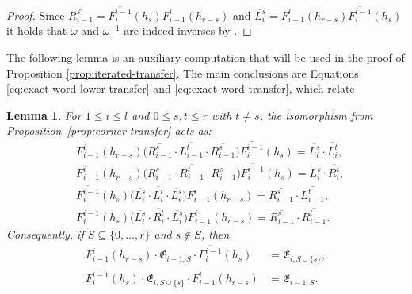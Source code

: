 \documentclass[12pt]{amsart}
\newtheorem{lemma}[theorem]{Lemma}
\theoremstyle{definition}
\theoremstyle{remark}
\numberwithin{equation}{section}
\numberwithin{figure}{section}
\newcommand{\Li}[2]{\overline{L^{#1}_{#2}}}
\newcommand{\Ri}[2]{\overline{R^{#1}_{#2}}}
\begin{document}
\begin{proof}
Since $\Ri{s}{i-1} =  \overline{F_i^{i-1}}(h_s)F_{i-1}^{i}(h_{r-s})$ and $\Li{s}{i} = F_{i-1}^{i}(h_{r-s}) \overline{F_i^{i-1}}(h_s)$ it holds that $\omega$ and $\omega^{-1}$ are indeed inverses by \cite[Exercise 3.4]{Bresar2014}. 
\end{proof}

The following lemma is an auxiliary computation that will be used in the proof of Proposition \ref{prop:iterated-transfer}. The main conclusions are Equations \eqref{eq:exact-word-lower-transfer} and \eqref{eq:exact-word-transfer}, which relate 

\begin{lemma}\label{lem:choice-transfer}
For $1\leq i\leq l$ and $0\leq s,t\leq r$ with $t\neq s$, the
isomorphism from Proposition~\ref{prop:corner-transfer} acts as:
\begin{align}
 &F_{i-1}^{i}(h_{r-s})  \bigl(\Ri{s}{i-1}\cdot \Li{t}{i-1} \cdot\Ri{s}{i-1}\bigr)  \overline{F_i^{i-1}}(h_s)  =\Li{s}{i} \cdot\Li{t}{i},
 \label{eq:L-choice-transfer} \\
 &F_{i-1}^{i}(h_{r-s})  \bigl(\Ri{s}{i-1}\cdot \Ri{t}{i-1}\cdot \Ri{s}{i-1}\bigr)  \overline{F_i^{i-1}}(h_s)  =\Li{s}{i} \cdot \Ri{t}{i},
 \label{eq:R-choice-transfer} \\
  &\overline{F_i^{i-1}}(h_s)  \bigl(\Li{s}{i}\cdot \Li{t}{i}\cdot\Li{s}{i}\bigr)  F_{i-1}^{i}(h_{r-s})  =\Ri{s}{i-1}\cdot\Li{t}{i-1},
 \label{eq:L-choice-lower-transfer}\\
 &\overline{F_i^{i-1}}(h_s)  \bigl(\Li{s}{i}\cdot \Ri{t}{i}\cdot\Li{s}{i}\bigr)  F_{i-1}^{i}(h_{r-s})  =\Ri{s}{i-1}\cdot\Ri{t}{i-1}.
 \label{eq:R-choice-lower-transfer}
\end{align}
Consequently, if $S\subseteq\{0,\ldots,r\}$ and $s\notin S$, then
\begin{align}
 F_{i-1}^{i}(h_{r-s}) \cdot \mathfrak{E}_{i-1, S}\cdot \overline{F_i^{i-1}}(h_s)&=\mathfrak{E}_{i, S\cup\{s\}},\label{eq:exact-word-transfer} \\
  \overline{F_i^{i-1}}(h_s)\cdot \mathfrak{E}_{i, S\cup\{s\}}  \cdot  F_{i-1}^{i}(h_{r-s})&= \mathfrak{E}_{i-1, S}.\label{eq:exact-word-lower-transfer}
\end{align}
\end{lemma}
\end{document}
